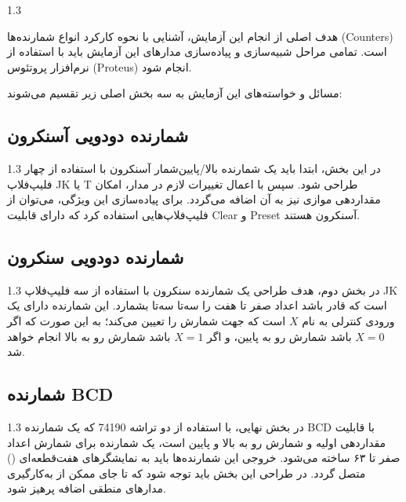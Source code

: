 \documentclass[a4paper,12pt]{article}
\numberwithin{figure}{subsection}
\begin{document}
\begin{spacing}{1.3}

هدف اصلی از انجام این آزمایش، آشنایی با نحوه کارکرد انواع شمارنده‌ها (Counters) است. تمامی مراحل شبیه‌سازی و پیاده‌سازی مدارهای این آزمایش باید با استفاده از نرم‌افزار پروتئوس (Proteus) انجام شود.

مسائل و خواسته‌های این آزمایش به سه بخش اصلی زیر تقسیم می‌شوند:
\end{spacing}


\subsection{شمارنده دودویی آسنکرون}
\leavevmode\par
\vspace{0.2cm}

\begin{spacing}{1.3}
در این بخش، ابتدا باید یک شمارنده بالا/پایین‌شمار آسنکرون با استفاده از چهار فلیپ‌فلاپ JK یا T طراحی شود. سپس با اعمال تغییرات لازم در مدار، امکان مقداردهی موازی نیز به آن اضافه می‌گردد. برای پیاده‌سازی این ویژگی، می‌توان از فلیپ‌فلاپ‌هایی 
استفاده کرد که دارای قابلیت Clear و Preset آسنکرون هستند.
\end{spacing}

\subsection{شمارنده دودویی سنکرون}
\leavevmode\par
\vspace{0.2cm}

\begin{spacing}{1.3}
در بخش دوم، هدف طراحی یک شمارنده سنکرون با استفاده از سه فلیپ‌فلاپ JK است که قادر باشد اعداد صفر تا هفت را سه‌تا سه‌تا بشمارد. این شمارنده دارای یک ورودی کنترلی به نام $X$ است که جهت شمارش را تعیین می‌کند؛ به این صورت که اگر $X=0$ باشد شمارش رو به پایین، و اگر $X=1$ باشد شمارش رو به بالا انجام خواهد شد.
\end{spacing}

\subsection{شمارنده BCD}
\leavevmode\par
\vspace{0.2cm}

\begin{spacing}{1.3}
در بخش نهایی، با استفاده از دو تراشه 74190 که یک شمارنده BCD با قابلیت مقداردهی اولیه و شمارش رو به بالا و پایین است، یک شمارنده برای شمارش اعداد صفر تا ۶۳ ساخته می‌شود. خروجی این شمارنده‌ها باید به نمایشگرهای هفت‌قطعه‌ای () متصل گردد. در طراحی این بخش باید توجه شود که تا جای ممکن از به‌کارگیری مدارهای منطقی اضافه پرهیز شود.
\end{spacing}
\end{document}
